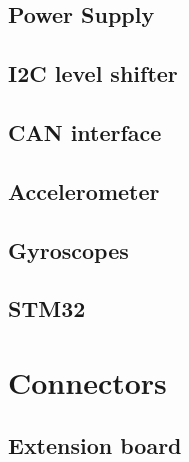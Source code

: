 \documentclass[11pt, a4paper]{article}
\begin{document}
\subsection{Power Supply} %
\label{sub:Power Supply}


\subsection{I2C level shifter} %
\label{sub:I2C level shifter}


\subsection{CAN interface} %
\label{sub:CAN interface}


\subsection{Accelerometer} %
\label{sub:Accelerometer}


\subsection{Gyroscopes} %
\label{sub:Gyroscopes}


\subsection{STM32} %
\label{sub:STM32}


\section{Connectors} %
\label{sec:Connectors}

\subsection{Extension board} %
\label{sub:Extension board}

\end{document}
